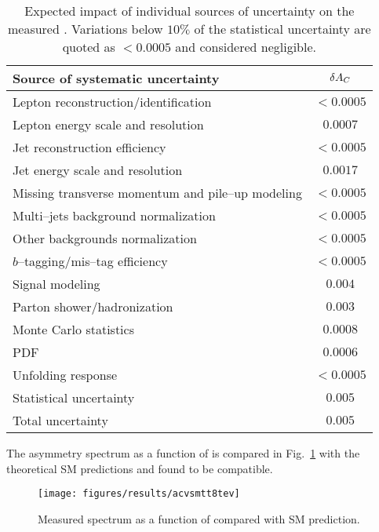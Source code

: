 \begin{table}[!htb]\centering
\begin{tabular}{l c}
\toprule
Source of systematic uncertainty  & $\delta{\ensuremath{A_C}{}}$ \\
\midrule
Lepton reconstruction/identification    & $<0.0005$\\
Lepton energy scale and resolution      &  $0.0007$\\
Jet reconstruction efficiency                 &  $<0.0005$ \\
Jet energy scale and resolution             &  $0.0017$ \\
Missing transverse momentum and pile--up modeling& $<0.0005$\\
Multi--jets background normalization & $<0.0005$\\
Other backgrounds normalization        & $<0.0005$\\
$b$--tagging/mis--tag efficiency       & $<0.0005$\\
Signal modeling                                    & $0.004$\\
Parton shower/hadronization                & $0.003$\\
Monte Carlo statistics                            & $0.0008$\\
PDF                                                        &$0.0006$\\
Unfolding response                               &$<0.0005$\\
\midrule
Statistical uncertainty                           & $0.005$ \\
\midrule
Total uncertainty                                   & $0.005$ \\
\bottomrule
\end{tabular}
\caption{Expected impact of individual sources of uncertainty on the
  measured \ac{}. Variations below $10\%$ of the
  statistical uncertainty are quoted as $<0.0005$ and considered negligible.}
\label{tab:8tevsystematics}
\end{table}

The asymmetry spectrum as a function of
\mtt{} is compared in Fig.~\ref{fig:8tevacvsmtt}
with the theoretical SM predictions and found to be compatible. 

\begin{figure}[!htb]\centering
  \texttt{[image: figures/results/acvsmtt8tev]}
  \caption{Measured \ac{} spectrum as a function of \mtt{} compared with SM prediction.}
  \label{fig:8tevacvsmtt}
\end{figure}


